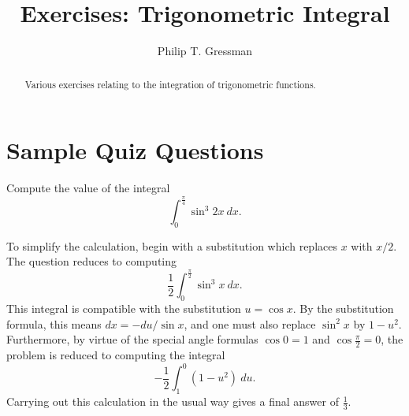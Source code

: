 \documentclass{ximera}
\title{Exercises: Trigonometric Integral}
\author{Philip T. Gressman}
\begin{document}
\begin{abstract}
Various exercises relating to the integration of trigonometric functions.
\end{abstract}
\maketitle


\section*{Sample Quiz Questions}

\begin{question}%

Compute the value of the integral
\[\int_{0}^{\frac{\pi}{4}} \sin^{3} 2x ~dx.\]
\begin{multiplechoice}
\end{multiplechoice}
\begin{feedback}
To simplify the calculation, begin with a substitution which replaces \(x\) with \(x/2\). The question reduces to computing
\[\frac{1}{2}\int_{0}^{\frac{\pi}{2}} \sin^{3} x ~dx.\]
This integral is compatible with the substitution \(u = \cos x\). By the substitution formula, this means \(dx = - du / \sin x\), and one must also replace \(\sin^2 x\) by \(1 - u^2\). Furthermore, by virtue of the special angle formulas \(\cos 0 = 1\) and \(\cos \frac{\pi}{2} = 0\), the problem is reduced to computing the integral
\[-\frac{1}{2}\int_{1}^{0} (1 - u^2) ~du.\]
Carrying out this calculation in the usual way gives a final answer of \(\frac{1}{3}\).
\end{feedback}

\end{question}
\end{document}
